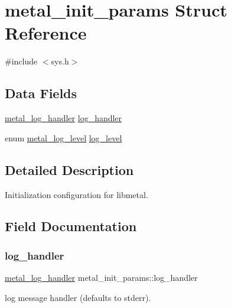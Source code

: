 \hypertarget{structmetal__init__params}{}\section{metal\+\_\+init\+\_\+params Struct Reference}
\label{structmetal__init__params}


{\ttfamily \#include $<$sys.\+h$>$}

\subsection*{Data Fields}
\begin{DoxyCompactItemize}
\item 
\hyperlink{group__logging_gaa79b2a8962227bb67c242b98afda292a}{metal\+\_\+log\+\_\+handler} \hyperlink{structmetal__init__params_a003ca9040adcaada7f03faaef46f1b59}{log\+\_\+handler}
\item 
enum \hyperlink{group__logging_ga4ffa0f4a1339af510aca7f817ee36d82}{metal\+\_\+log\+\_\+level} \hyperlink{structmetal__init__params_aafc486469d934fd02ea4926ba1d377cc}{log\+\_\+level}
\end{DoxyCompactItemize}


\subsection{Detailed Description}
Initialization configuration for libmetal. 

\subsection{Field Documentation}
\mbox{\label{structmetal__init__params_a003ca9040adcaada7f03faaef46f1b59}} 
\subsubsection{\texorpdfstring{log\+\_\+handler}{log\_handler}}
{\footnotesize\ttfamily \hyperlink{group__logging_gaa79b2a8962227bb67c242b98afda292a}{metal\+\_\+log\+\_\+handler} metal\+\_\+init\+\_\+params\+::log\+\_\+handler}

log message handler (defaults to stderr). \mbox{\label{structmetal__init__params_aafc486469d934fd02ea4926ba1d377cc}} 

